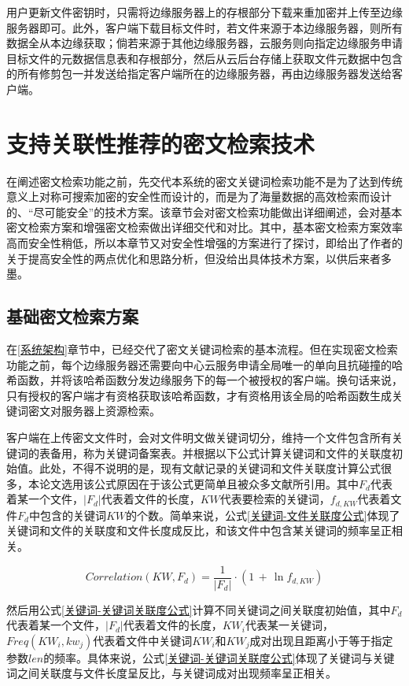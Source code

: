 \documentclass[promaster]{thesis-uestc}
\begin{document}
用户更新文件密钥时，只需将边缘服务器上的存根部分下载来重加密并上传至边缘服务器即可。此外，客户端下载目标文件时，若文件来源于本边缘服务器，则所有数据全从本边缘获取；倘若来源于其他边缘服务器，云服务则向指定边缘服务申请目标文件的元数据信息表和存根部分，然后从云后台存储上获取文件元数据中包含的所有修剪包一并发送给指定客户端所在的边缘服务器，再由边缘服务器发送给客户端。

\section{支持关联性推荐的密文检索技术}\label{keyword_search}
在阐述密文检索功能之前，先交代本系统的密文关键词检索功能不是为了达到传统意义上对称可搜索加密的安全性而设计的，而是为了海量数据的高效检索而设计的、“尽可能安全”的技术方案。该章节会对密文检索功能做出详细阐述，会对基本密文检索方案和增强密文检索做出详细交代和对比。其中，基本密文检索方案效率高而安全性稍低，所以本章节又对安全性增强的方案进行了探讨，即给出了作者的关于提高安全性的两点优化和思路分析，但没给出具体技术方案，以供后来者多墨。
\subsection{基础密文检索方案}\label{基础密文检索方案}
在\ref{系统架构}章节中，已经交代了密文关键词检索的基本流程。但在实现密文检索功能之前，每个边缘服务器还需要向中心云服务申请全局唯一的单向且抗碰撞的哈希函数，并将该哈希函数分发边缘服务下的每一个被授权的客户端。换句话来说，只有授权的客户端才有资格获取该哈希函数，才有资格用该全局的哈希函数生成关键词密文对服务器上资源检索。

客户端在上传密文文件时，会对文件明文做关键词切分，维持一个文件包含所有关键词的表备用，称为关键词备案表。并根据以下公式计算关键词和文件的关联度初始值。此处，不得不说明的是，现有文献记录的关键词和文件关联度计算公式很多，本论文选用该公式原因在于该公式更简单且被众多文献所引用。其中$F_d$代表着某一个文件，$|F_d|$代表着文件的长度，$KW$代表要检索的关键词，$f_{d,KW}$代表着文件$F_d$中包含的关键词$KW$的个数。简单来说，公式\ref{关键词-文件关联度公式}体现了关键词和文件的关联度和文件长度成反比，和该文件中包含某关键词的频率呈正相关。

\begin{equation}
    Correlation(KW, F_d) = \frac{1}{|F_d|} \cdot (1\,+\,\ln{f_{d,KW}})
    \label{关键词-文件关联度公式}
\end{equation}

然后用公式\ref{关键词-关键词关联度公式}计算不同关键词之间关联度初始值，其中$F_d$代表着某一个文件，$|F_d|$代表着文件的长度，$KW_i$代表某一关键词，$Freq(KW_i, kw_j)$代表着文件中关键词$KW_i$和$KW_j$成对出现且距离小于等于指定参数$len$的频率。具体来说，公式\ref{关键词-关键词关联度公式}体现了关键词与关键词之间关联度与文件长度呈反比，与关键词成对出现频率呈正相关。
\end{document}

